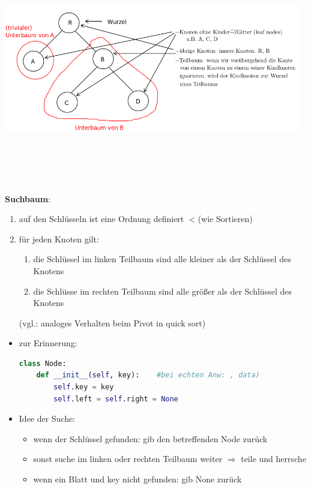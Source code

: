 \documentclass[11pt, fleqn]{scrreprt}
\begin{document}
\includegraphics[width=13cm,height=10cm,keepaspectratio]{./Pictures/binaerBaum2.png}

\textbf{Suchbaum}: 
\begin{enumerate}
	\item auf den Schlüsseln ist eine Ordnung definiert \glqq $<$\grqq (wie Sortieren)
	\item für jeden Knoten gilt: 
	\begin{enumerate}[label=\alph*)]
		\item die Schlüssel im linken Teilbaum sind alle kleiner als der Schlüssel des Knotens
		\item die Schlüsse im rechten Teilbaum sind alle größer als der Schlüssel des Knotens
	\end{enumerate}
	(vgl.: analoges Verhalten beim Pivot in quick sort)
\end{enumerate}
\begin{itemize}
	\item zur Erinnerung: \\
	\begin{lstlisting}[language=Python]
class Node:
	def __init__(self, key):	#bei echten Anw: , data)
		self.key = key
		self.left = self.right = None
	\end{lstlisting}
	\item Idee der Suche:
	\begin{itemize}
		\item wenn der Schlüssel gefunden: gib den betreffenden Node zurück
		\item sonst suche im linken oder rechten Teilbaum weiter $\Rightarrow$ \glqq teile und herrsche\grqq
		\item wenn ein Blatt und key nicht gefunden: gib None zurück
	\end{itemize}
\end{itemize}
\end{document}
